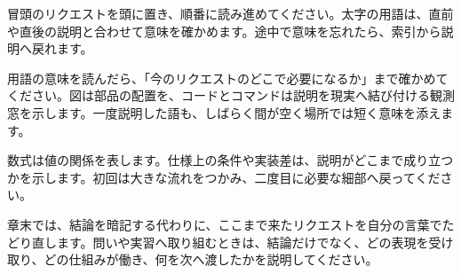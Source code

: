 冒頭のリクエストを頭に置き、順番に読み進めてください。太字の用語は、直前や直後の説明と合わせて意味を確かめます。途中で意味を忘れたら、索引から説明へ戻れます。

用語の意味を読んだら、「今のリクエストのどこで必要になるか」まで確かめてください。図は部品の配置を、コードとコマンドは説明を現実へ結び付ける観測窓を示します。一度説明した語も、しばらく間が空く場所では短く意味を添えます。

数式は値の関係を表します。仕様上の条件や実装差は、説明がどこまで成り立つかを示します。初回は大きな流れをつかみ、二度目に必要な細部へ戻ってください。

章末では、結論を暗記する代わりに、ここまで来たリクエストを自分の言葉でたどり直します。問いや実習へ取り組むときは、結論だけでなく、どの表現を受け取り、どの仕組みが働き、何を次へ渡したかを説明してください。

